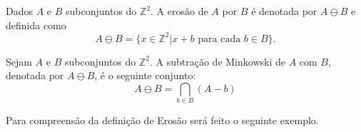 \begin{define}
	Dados $A$ e $B$ subconjuntos do $\mathbb{Z}^2$. A erosão de $A$ por $B$ é denotada por $A \ominus B$ e definida como
	\begin{equation}
		A \ominus B = \{x \in \mathbb{Z}^2 | x + b \text{ para cada } b \in B\}.
	\end{equation}
	\label{def:erosao_1}
\end{define}

\begin{define}
	Sejam $A$ e $B$ subconjuntos do $\mathbb{Z}^2$. A subtração de Minkowski de $A$ com $B$, denotada por $A \ominus B$, é o seguinte conjunto: 
	\begin{equation}
		A \ominus B = \bigcap_{b \in B} (A - b)
	\end{equation}
	\label{def:erosao_2}
\end{define}

Para compreensão da definição de Erosão será feito o seguinte exemplo.

